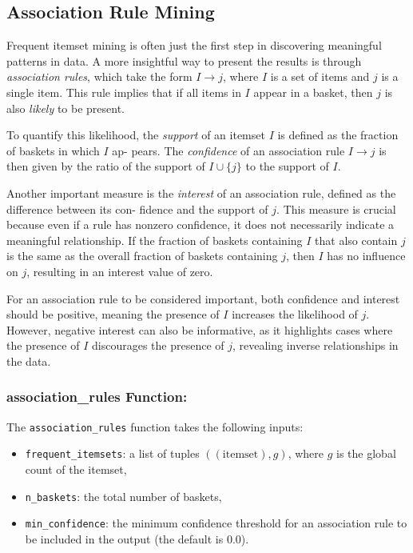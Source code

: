 \documentclass{Class/julia}
\begin{document}
\subsection{Association Rule Mining}

Frequent itemset mining is often just the first step in discovering meaningful patterns in data. A more insightful way to present the results is through \textit{association rules}, which take the form \( I \rightarrow j \), where \( I \) is a set of items and \( j \) is a single item. This rule implies that if all items in \( I \) appear in a basket, then \( j \) is also \textit{likely} to be present.

To quantify this likelihood, the \textit{support} of an itemset \( I \) is defined as the fraction of baskets in which \( I \) ap- pears. The \textit{confidence} of an association rule \( I \rightarrow j \) is then given by the ratio of the support of \( I \cup \{j\} \) to the support of \( I \).

Another important measure is the \textit{interest} of an association rule, defined as the difference between its con- fidence and the support of \( j \). This measure is crucial because even if a rule has nonzero confidence, it does not necessarily indicate a meaningful relationship. If the fraction of baskets containing \( I \) that also contain \( j \) is the same as the overall fraction of baskets containing \( j \), then \( I \) has no influence on \( j \), resulting in an interest value of zero. 

For an association rule to be considered important, both confidence and interest should be positive, meaning the presence of \( I \) increases the likelihood of \( j \). However, negative interest can also be informative, as it highlights cases where the presence of \( I \) discourages the presence of \( j \), revealing inverse relationships in the data.

\subsubsection*{association\_rules Function:}

The \texttt{association\_rules} function takes the following inputs:

\begin{itemize}
    \item \texttt{frequent\_itemsets}: a list of tuples \(((\text{itemset}), g)\), where \( g \) is the global count of the itemset,
    \item \texttt{n\_baskets}: the total number of baskets,
    \item \texttt{min\_confidence}: the minimum confidence threshold for an association rule to be included in the output (the default is 0.0).
\end{itemize}
\end{document}
